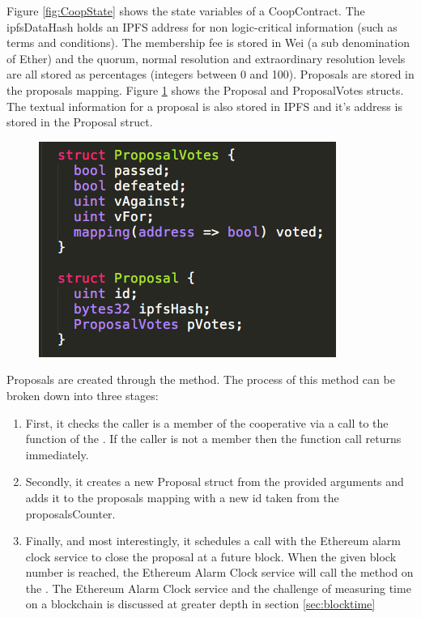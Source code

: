 Figure \ref{fig:CoopState} shows the state variables of a CoopContract. The ipfsDataHash holds an IPFS address for non logic-critical information (such as terms and conditions). The membership fee is stored in Wei (a sub denomination of Ether) and the quorum, normal resolution and extraordinary resolution levels are all stored as percentages (integers between 0 and 100). Proposals are stored in the proposals mapping. Figure \ref{fig:ProposalStructs} shows the Proposal and ProposalVotes structs. The textual information for a proposal is also stored in IPFS and it's address is stored in the Proposal struct.\\

\begin{figure}
\centering
\includegraphics[width=\textwidth]{Figures/ProposalStructs}
\decoRule
\caption[]{ }
\label{fig:ProposalStructs}
\end{figure}

Proposals are created through the  method. The process of this method can be broken down into three stages: 
\begin{enumerate}
\item First, it checks the caller is a member of the cooperative via a call to the  function of the . If the caller is not a member then the function call returns immediately. 
\item Secondly, it creates a new Proposal struct from the provided arguments and adds it to the proposals mapping with a new id taken from the proposalsCounter. 
\item Finally, and most interestingly, it schedules a call with the Ethereum alarm clock service to close the proposal at a future block. When the given block number is reached, the Ethereum Alarm Clock service will call the  method on the . The Ethereum Alarm Clock service and the challenge of measuring time on a blockchain is discussed at greater depth in section \ref{sec:blocktime}
\end{enumerate}


